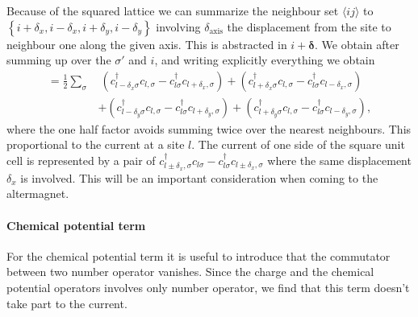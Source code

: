 \documentclass[../main.tex]{subfile}
\begin{document}
Because of the squared lattice we can summarize the neighbour set $\langle ij\rangle$ to $\left\{ i + \delta_x , i - \delta_x, i + \delta_y, i - \delta_y   \right\}$ involving
$\delta_{\text{axis}}$ the displacement from the site to neighbour one along the given axis. This is abstracted in $i+ \bm{\delta}$.
We obtain after summing up over the $\sigma'$ and $i$, and writing explicitly everything we obtain 
\begin{equation}\label{Eq:CurrentHoppingCommu}
    \begin{aligned}
        =\frac{1}{2} \sum_{\sigma} 
       &~(c_{l-\delta_x\sigma}^{\dagger}c_{l,\sigma} -c_{l\sigma}^{\dagger}c_{l+\delta_x,\sigma})  
       +(c_{l+\delta_x\sigma}^{\dagger}c_{l,\sigma} -c_{l\sigma}^{\dagger}c_{l-\delta_x,\sigma})\\
       &+(c_{l-\delta_y\sigma}^{\dagger}c_{l,\sigma} -c_{l\sigma}^{\dagger}c_{l+\delta_y,\sigma})
       +(c_{l+\delta_y\sigma}^{\dagger}c_{l,\sigma} -c_{l\sigma}^{\dagger}c_{l-\delta_y,\sigma}),
\end{aligned}
\end{equation}
where the one half factor avoids summing twice over the nearest neighbours. This proportional to the current at a site $l$.
The current of one side of the square unit cell is represented by a pair of $c_{l\pm\delta_x,\sigma}^{\dagger}c_{l\sigma} -c_{l\sigma}^{\dagger}c_{l\pm\delta_x,\sigma}$
where the same displacement $\delta_x$ is involved. This will be an important consideration when coming to the altermagnet.\\

\paragraph{Chemical potential term} $~$\\
 For the chemical potential term it is useful to introduce that the commutator between two number operator vanishes. 
Since the charge and the chemical potential operators involves only number operator, we find that this term doesn't take part
to the current.
\end{document}

